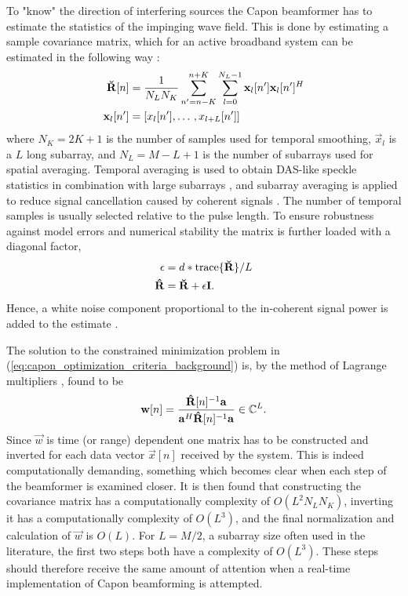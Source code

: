To "know" the direction of interfering sources the Capon beamformer has to estimate the statistics of the impinging wave field. This is done by estimating a sample covariance matrix, which for an active broadband system can be estimated in the following way \cite{Synnevag2009}:
\begin{align}
\mathbf{\breve{R}}[n] &= \frac{1}{N_LN_K}\sum_{n'=n-K}^{n+K} \sum_{l=0}^{N_L-1} \mathbf{x}_l[n']\mathbf{x}_l[n']^H\\
\mathbf{x}_l[n'] &= [x_l[n'], \dotso, x_{l+L}[n']]
\end{align}
where $N_K = 2K + 1$  is the number of samples used for temporal smoothing, $\vec{x}_l$ is a $L$ long subarray, and $N_L = M-L+1$ is the number of subarrays used for spatial averaging.  Temporal averaging is used to obtain DAS-like speckle statistics in combination with large subarrays \cite{Synnevag2007a}, and subarray averaging is applied to reduce signal cancellation caused by coherent signals \cite{Reddy1987}. The number of temporal samples is usually selected relative to the pulse length. To ensure robustness against model errors and numerical stability the matrix is further loaded with a diagonal factor, 
\begin{align}
\epsilon &= d*\text{trace}\{\mathbf{\breve{R}}\}/L\\
\mathbf{\hat{R}} &= \mathbf{\breve{R}} + \epsilon\mathbf{I}.
\end{align} 
Hence, a white noise component proportional to the in-coherent signal power is added to the estimate \cite{Featherstone1997b}.

The solution to the constrained minimization problem in (\ref{eq:capon_optimization_criteria_background}) is, by the method of Lagrange multipliers \cite{VanTrees2003}, found to be
\begin{align}\label{eq:capon_weights}
\mathbf{w}[n] = \frac{\mathbf{\hat{R}}[n]^{-1}\mathbf{a}}{\mathbf{a}^H\mathbf{\hat{R}}[n]^{-1}\mathbf{a}} \in \mathbb{C}^L.
\end{align}
Since $\vec{w}$ is time (or range) dependent one matrix has to be constructed and inverted for each data vector $\vec{x}[n]$ received by the system. This is indeed computationally demanding, something which becomes clear when each step of the beamformer is examined closer. It is then found that constructing the covariance matrix has a computationally complexity of $O(L^2N_LN_K)$, inverting it has a computationally complexity of $O(L^3)$, and the final normalization and calculation of $\vec{w}$ is $O(L)$. For $L=M/2$, a subarray size often used in the literature, the first two steps both have a complexity of $O(L^3)$. These steps should therefore receive the same amount of attention when a real-time implementation of Capon beamforming is attempted.

